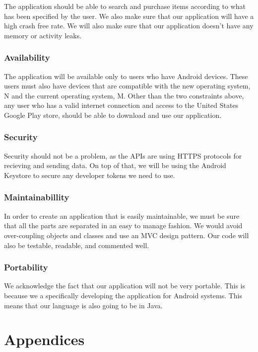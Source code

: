 \documentclass[journal,compsoc, 10pt, draftclsnofoot, onecolumn]{IEEEtran}
\begin{document}
The application should be able to search and purchase items according to what 
has been specified by the user. We also make sure that our application will 
have a high crash free rate. We will also make sure that our application doesn't
 have any memory or activity leaks.

\subsubsection{Availability}

The application will be available only to users who have Android devices. These 
users must also have devices that are compatible with the new operating system, 
N and the current operating system, M. Other than the two constraints above, 
any user who has a valid internet connection and access to the United 
States Google Play store, should be able to download and use our application.

\subsubsection{Security}

Security should not be a problem, as the APIs are using HTTPS protocols for 
recieving and sending data. On top of that, we will be using the Android 
Keystore to secure any developer tokens we need to use.

\subsubsection{Maintainabillity}

In order to create an application that is easily maintainable, we must be sure 
that all the parts are separated in an easy to manage fashion. We would avoid 
over-coupling objects and classes and use an MVC design pattern. Our code 
will also be testable, readable, and commented well.

\subsubsection{Portability}

We acknowledge the fact that our application will not be very portable. This is 
because we a specifically developing the application for Android systems. This 
means that our language is also going to be in Java. 

\newpage

\section{Appendices}
\end{document}
